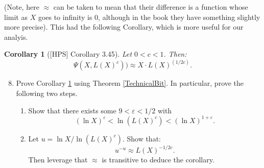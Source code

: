 \documentclass[11pt]{article}
\newtheorem{corollary}{Corollary}
\begin{document}
(Note, here $\approx$ can be taken to mean that their difference is a function whose limit as $X$ goes to infinity is $0$, although in the book they have something slightly more precise).  This had the following Corollary, which is more useful for our analyis.
\begin{corollary}[{[HPS] Corollary 3.45}]\label{technicalCorollary}
  Let $0<c<1$.  Then:
  \[\Psi(X,L(X)^c))\approx X\cdot L(X)^{(1/2c)}.\]
\end{corollary}
\begin{enumerate}
  \setcounter{enumi}{7}
  \item{
  Prove Corollary \ref{technicalCorollary} using Theorem \ref{TechnicalBit}.  In particular, prove the following two steps.
  \begin{enumerate}
    \item{
      Show that there exists some $9<\varepsilon<1/2$ with
      \[(\ln X)^\varepsilon < \ln (L(X)^c) < (\ln X)^{1+\varepsilon}.\]
    }
    \item{
    Let $u = \ln X/\ln(L(X)^c)$.  Show that:
    \[u^{-u}\approx L(X)^{-1/2c}.\]
    Then leverage that $\approx$ is transitive to deduce the corollary.
    }
  \end{enumerate}
  }
\end{enumerate}
\end{document}
